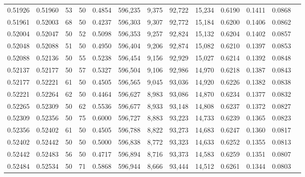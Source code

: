 \begin{tabular}{rrrrrrrrrrrrr}
0.51926 & 0.51960 &    53 &  50 &                                     0.4854 & 596,235 &   9,375 &  92,722 &  15,234 & 0.6190 & 0.1411 & 0.0868 \\
0.51961 & 0.52003 &    68 &  50 &                                     0.4237 & 596,303 &   9,307 &  92,772 &  15,184 & 0.6200 & 0.1406 & 0.0862 \\
0.52004 & 0.52047 &    50 &  52 &                                     0.5098 & 596,353 &   9,257 &  92,824 &  15,132 & 0.6204 & 0.1402 & 0.0857 \\
0.52048 & 0.52088 &    51 &  50 &                                     0.4950 & 596,404 &   9,206 &  92,874 &  15,082 & 0.6210 & 0.1397 & 0.0853 \\
0.52088 & 0.52136 &    50 &  55 &                                     0.5238 & 596,454 &   9,156 &  92,929 &  15,027 & 0.6214 & 0.1392 & 0.0848 \\
0.52137 & 0.52177 &    50 &  57 &                                     0.5327 & 596,504 &   9,106 &  92,986 &  14,970 & 0.6218 & 0.1387 & 0.0843 \\
0.52177 & 0.52221 &    61 &  50 &                                     0.4505 & 596,565 &   9,045 &  93,036 &  14,920 & 0.6226 & 0.1382 & 0.0838 \\
0.52221 & 0.52264 &    62 &  50 &                                     0.4464 & 596,627 &   8,983 &  93,086 &  14,870 & 0.6234 & 0.1377 & 0.0832 \\
0.52265 & 0.52309 &    50 &  62 &                                     0.5536 & 596,677 &   8,933 &  93,148 &  14,808 & 0.6237 & 0.1372 & 0.0827 \\
0.52309 & 0.52356 &    50 &  75 &                                     0.6000 & 596,727 &   8,883 &  93,223 &  14,733 & 0.6239 & 0.1365 & 0.0823 \\
0.52356 & 0.52402 &    61 &  50 &                                     0.4505 & 596,788 &   8,822 &  93,273 &  14,683 & 0.6247 & 0.1360 & 0.0817 \\
0.52402 & 0.52442 &    50 &  50 &                                     0.5000 & 596,838 &   8,772 &  93,323 &  14,633 & 0.6252 & 0.1355 & 0.0813 \\
0.52442 & 0.52483 &    56 &  50 &                                     0.4717 & 596,894 &   8,716 &  93,373 &  14,583 & 0.6259 & 0.1351 & 0.0807 \\
0.52484 & 0.52534 &    50 &  71 &                                     0.5868 & 596,944 &   8,666 &  93,444 &  14,512 & 0.6261 & 0.1344 & 0.0803 \\

\end{tabular}

